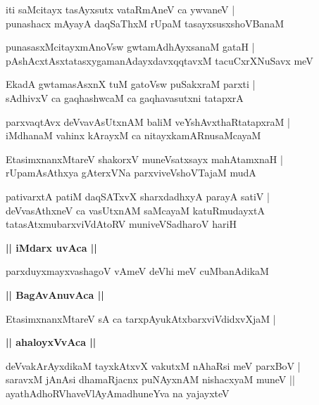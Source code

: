 \documentclass[twoside,12pt,openright]{book}
\newcounter{shloka}[chapter]
\def\uvaca#1{\centerline{{\large\textbf{#1}}}}
\begin{document}
\begin{shloka}%
iti saMcitayx tasAyxsutx vataRmAneV ca ywvaneV |\\
punashacx mAyayA daqSaThxM rUpaM tasayxsusxshoVBanaM 
\end{shloka}

\begin{shloka}%
punasasxMcitayxmAnoVsw gwtamAdhAyxsanaM gataH |\\
pAshAcxtAsxtatasxygamanAdayxdavxqqtavxM tacuCxrXNuSavx meV
\end{shloka}

\begin{shloka}%
EkadA gwtamasAsxnX tuM gatoVsw puSakxraM parxti |\\
sAdhivxV ca gaqhashwcaM ca gaqhavasutxni tatapxrA 
\end{shloka}

\begin{shloka}%
parxvaqtAvx deVvavAsUtxnAM baliM veYshAvxthaRtatapxraM |\\
iMdhanaM vahinx kArayxM ca nitayxkamARnusaMcayaM 
\end{shloka}

\begin{shloka}%
EtasimxnanxMtareV shakorxV muneVsatxsayx mahAtamxnaH |\\
rUpamAsAthxya gAterxVNa parxviveVshoVTajaM mudA 
\end{shloka}

\begin{shloka}%
pativarxtA patiM daqSATxvX sharxdadhxyA parayA satiV |\\
deVvasAthxneV ca vasUtxnAM saMcayaM katuRmudayxtA \\
tatasAtxmubarxviVdAtoRV muniveVSadharoV hariH 
\end{shloka}

\uvaca{|| iMdarx uvAca ||}

\begin{shloka}%
parxduyxmayxvashagoV vAmeV deVhi meV cuMbanAdikaM 
\end{shloka}

\uvaca{|| BagAvAnuvAca ||}

\begin{shloka}%
EtasimxnanxMtareV sA ca tarxpAyukAtxbarxviVdidxvXjaM |\\
\end{shloka}

\uvaca{|| ahaloyxVvAca ||}

\begin{shloka}%
deVvakArAyxdikaM tayxkAtxvX vakutxM nAhaRsi meV parxBoV |\\
saravxM jAnAsi dhamaRjacnx puNAyxnAM nishacxyaM muneV ||\\
ayathAdhoRVhaveVlAyAmadhuneYva na yajayxteV 
\end{shloka}
\end{document}
